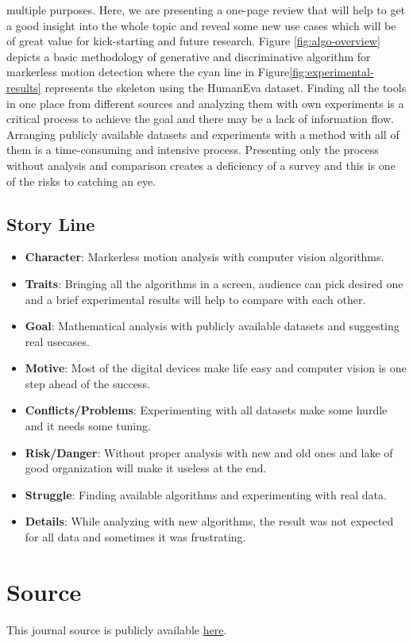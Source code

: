  multiple purposes. Here, we are presenting a one-page review that will help to get a good insight into the whole topic and reveal some new use cases which will be of great value for kick-starting and future research. Figure \ref{fig:algo-overview} depicts a basic methodology of generative and discriminative algorithm for markerless motion detection where the cyan line in Figure\ref{fig:experimental-results} represents the skeleton using the HumanEva dataset. Finding all the tools in one place from different sources and analyzing them with own experiments is a critical process to achieve the goal and there may be a lack of information flow. Arranging publicly available datasets and experiments with a method with all of them is a time-consuming and intensive process. Presenting only the process without analysis and comparison creates a deficiency of a survey and this is one of the risks to catching an eye.\\

\subsection{Story Line}
\begin{itemize}
    \item \textbf{Character}: Markerless motion analysis with computer vision algorithms.
    \item \textbf{Traits}: Bringing all the algorithms in a screen, audience can pick desired one and a brief experimental results will help to compare with each other. 
    \item \textbf{Goal}: Mathematical analysis with publicly available datasets and suggesting real usecases.
    \item \textbf{Motive}: Most of the digital devices make life easy and computer vision is one step ahead of the success.
    \item \textbf{Conflicts/Problems}: Experimenting with all datasets make some hurdle and it needs some tuning. 
    \item \textbf{Risk/Danger}: Without proper analysis with new and old ones and lake of good organization will make it useless at the end.
    \item \textbf{Struggle}: Finding available algorithms and experimenting with real data.
    \item \textbf{Details}: While analyzing with new algorithms, the result was not expected for all data and sometimes it was frustrating.
\end{itemize}

\section{Source}
This journal source is publicly available \href{https://github.com/shadhinaust/cs6000-w4-j4.git}{here}.\\




